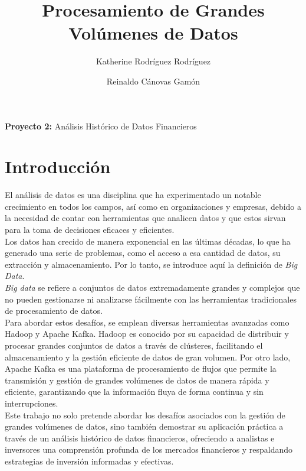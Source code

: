 \documentclass{article}
\begin{document}
	\title{\textbf{Procesamiento de Grandes Volúmenes de Datos}}
	\author{Katherine Rodríguez Rodríguez \and Reinaldo Cánovas Gamón}
	\date{} 
	
	\maketitle
	
	\begin{center}
		\textbf{Proyecto 2:} Análisis Histórico de Datos Financieros\\
	\tableofcontents
    \section{Introducción}
\end{center}
    \begin{flushleft}
    	El análisis de datos es una disciplina que ha experimentado un notable crecimiento en todos los campos, así como en organizaciones y empresas, debido a la necesidad de contar con herramientas que analicen datos y que estos sirvan para la toma de decisiones eficaces y eficientes.  \\
    	Los datos han crecido de manera exponencial en las últimas décadas, lo que ha generado una serie de problemas, como el acceso a esa cantidad de datos, su extracción y almacenamiento. Por lo tanto, se introduce aquí la definición de \textit{Big Data}. \\
    \textit{Big data} se refiere a conjuntos de datos extremadamente grandes y complejos que no pueden gestionarse ni analizarse fácilmente con las herramientas tradicionales de procesamiento de datos.  \\
    	Para abordar estos desafíos, se emplean diversas herramientas avanzadas como Hadoop y Apache Kafka. Hadoop es conocido por su capacidad de distribuir y procesar grandes conjuntos de datos a través de clústeres, facilitando el almacenamiento y la gestión eficiente de datos de gran volumen. Por otro lado, Apache Kafka es una plataforma de procesamiento de flujos que permite la transmisión y gestión de grandes volúmenes de datos de manera rápida y eficiente, garantizando que la información fluya de forma continua y sin interrupciones.\\
    	Este trabajo no solo pretende abordar los desafíos asociados con la gestión de grandes volúmenes de datos, sino también demostrar su aplicación práctica a través de un análisis histórico de datos financieros, ofreciendo a analistas e inversores una comprensión profunda de los mercados financieros y respaldando estrategias de inversión informadas y efectivas.
    \end{flushleft}
\end{document}

